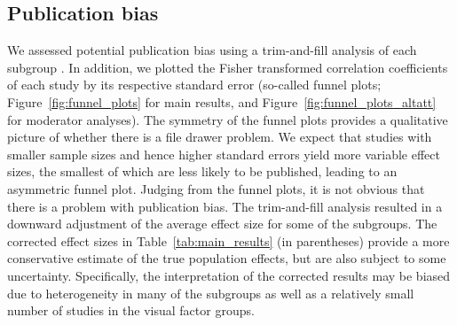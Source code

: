 \documentclass[english,natbib,man,floatsintext]{apa6}
\begin{document}
\subsection{Publication bias}

We assessed potential publication bias using a trim-and-fill analysis  of each subgroup \citep{duval2000trim}. In addition, we plotted the  Fisher transformed correlation coefficients of each study by its respective standard error (so-called funnel plots; Figure~\ref{fig:funnel_plots} for main results, and Figure~\ref{fig:funnel_plots_altatt} for moderator analyses). The symmetry of the funnel plots provides a qualitative picture of whether there is a file drawer problem. We expect that studies with smaller sample sizes and hence higher standard errors yield more variable effect sizes, the smallest of which are less likely to be published, leading to an asymmetric funnel plot. Judging from the funnel plots, it is not obvious that there is a problem with publication bias. The trim-and-fill analysis resulted in a downward adjustment of the average effect size for some of the subgroups. The corrected effect sizes in Table~\ref{tab:main_results} (in parentheses) provide a more conservative estimate of the true population effects, but are also subject to some uncertainty. Specifically, the interpretation of the corrected results may be biased due to heterogeneity in many of the subgroups as well as a relatively small number of studies in the visual factor groups. 
\end{document}
